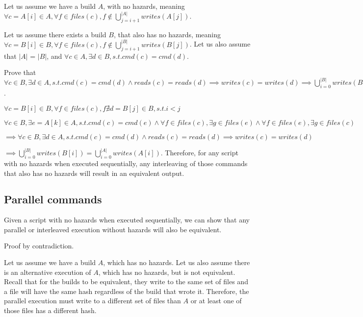Let us assume we have a build $A$, with no hazards, meaning $\forall c = A[i] \in A, \forall f \in files(c), f \notin \bigcup^{|A|}_{j=i+1} writes(A[j])$.

Let us assume there exists a build $B$, that also has no hazards, meaning $\forall c = B[i] \in B, \forall f \in files(c), f \notin \bigcup^{|B|}_{j=i+1} writes(B[j])$.
Let us also assume that $|A|$ = $|B|$, and $\forall c \in A, \exists d \in B, s.t. cmd(c) = cmd(d)$.

Prove that $\forall c \in B, \exists d \in A, s.t. cmd(c) = cmd(d) \land reads(c) = reads(d) \implies writes(c) = writes(d) \implies \bigcup^{|B|}_{i=0} writes(B[i]) = \bigcup^{|A|}_{i=0} writes(A[i])$.

$\forall c = B[i] \in B, \forall f \in files(c), f \nexists d = B[j] \in B, s.t. i < j$

$\forall c \in B, \exists e = A[k] \in A, s.t. cmd(c) = cmd(e) \land \forall f \in files(c), \exists g \in files(e) \land \forall f \in files(e), \exists g \in files(c)$

$\implies \forall c \in B, \exists d \in A, s.t. cmd(c) = cmd(d) \land reads(c) = reads(d) \implies writes(c) = writes(d)$

$\implies \bigcup^{|B|}_{i=0} writes(B[i]) = \bigcup^{|A|}_{i=0} writes(A[i])$.
Therefore, for any script with no hazards when executed sequentially, any interleaving of those commands that also has no hazards will result in an equivalent output.

\subsection{Parallel commands}
\label{sec:proof:parallel}

Given a script with no hazards when executed sequentially, we can show that any parallel or interleaved execution without hazards will also be equivalent.

Proof by contradiction.

Let us assume we have a build $A$, which has no hazards.  Let us also assume there is an alternative execution of $A$, which has no hazards, but is not equivalent.
Recall that for the builds to be equivalent, they write to the same set of files and a file will have the same hash regardless of the build that wrote it.
Therefore, the parallel execution must write to a different set of files than $A$ or at least one of those files has a different hash.

